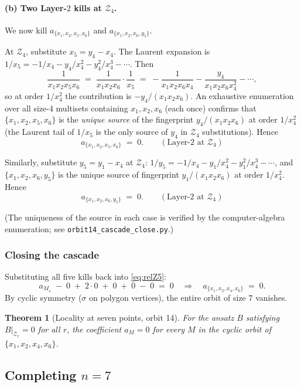 \documentclass[11pt]{article}
\newtheorem{theorem}{Theorem}
\newcommand{\Zr}{\mathcal{Z}}
\begin{document}
\paragraph{(b) Two Layer-$2$ kills at $\Zr_4$.} We now kill
$a_{\{x_1,x_2,x_5,x_6\}}$ and $a_{\{x_1,x_2,x_6,y_5\}}$.

At $\Zr_4$, substitute $x_5 = y_4 - x_4$. The Laurent expansion is
$1/x_5 = -1/x_4 - y_4/x_4^2 - y_4^2/x_4^3 - \cdots$. Then
\[
\frac{1}{x_1 x_2 x_5 x_6} \;=\; \frac{1}{x_1 x_2 x_6}\cdot\frac{1}{x_5}
\;=\; -\frac{1}{x_1 x_2 x_6 x_4} - \frac{y_4}{x_1 x_2 x_6 x_4^2} - \cdots,
\]
so at order $1/x_4^2$ the contribution is $-y_4/(x_1 x_2 x_6)$. An
exhaustive enumeration over all size-$4$ multisets containing $x_1, x_2, x_6$
(each once) confirms that $\{x_1, x_2, x_5, x_6\}$ is the \emph{unique
source} of the fingerprint $y_4/(x_1 x_2 x_6)$ at order $1/x_4^2$
(the Laurent tail of $1/x_5$ is the only source of $y_4$ in $\Zr_4$
substitutions). Hence
\[
a_{\{x_1,x_2,x_5,x_6\}} \;=\; 0. \qquad (\text{Layer-$2$ at } \Zr_4)
\]

Similarly, substitute $y_5 = y_1 - x_4$ at $\Zr_4$:
$1/y_5 = -1/x_4 - y_1/x_4^2 - y_1^2/x_4^3 - \cdots$, and
$\{x_1, x_2, x_6, y_5\}$ is the unique source of fingerprint
$y_1/(x_1 x_2 x_6)$ at order $1/x_4^2$. Hence
\[
a_{\{x_1,x_2,x_6,y_5\}} \;=\; 0. \qquad (\text{Layer-$2$ at } \Zr_4)
\]

(The uniqueness of the source in each case is verified by the
computer-algebra enumeration; see \texttt{orbit14\_cascade\_close.py}.)

\subsubsection*{Closing the cascade}

Substituting all five kills back into \eqref{eq:relZ5}:
\[
a_{M_\star} \;-\; 0 \;+\; 2\!\cdot\!0 \;+\; 0 \;+\; 0 \;-\; 0
\;=\; 0 \quad\Longrightarrow\quad
\boxed{a_{\{x_1, x_2, x_4, x_6\}} \;=\; 0.}
\]
By cyclic symmetry ($\sigma$ on polygon vertices), the entire orbit of
size $7$ vanishes.

\begin{theorem}[Locality at seven points, orbit 14]\label{thm:n7orbit14}
For the ansatz $B$ satisfying $B|_{\Zr_r} = 0$ for all $r$, the
coefficient $a_M = 0$ for every $M$ in the cyclic orbit of
$\{x_1, x_2, x_4, x_6\}$.
\end{theorem}

\subsection{Completing $n=7$}
\end{document}
